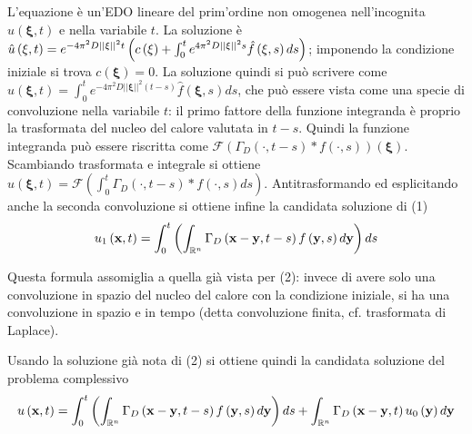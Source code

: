 \documentclass{article}
\begin{document}
L'equazione \`{e} un'EDO lineare del prim'ordine non omogenea nell'incognita 
$\hat{u}\left( \mathbf{\xi },t\right) $ e nella variabile $t$. La soluzione 
\`{e} $\hat{u}\left( \mathbf{\xi },t\right) =e^{-4\pi ^{2}D\left\vert
\left\vert \mathbf{\xi }\right\vert \right\vert ^{2}t}\left( c\left( \mathbf{%
\xi }\right) +\int_{0}^{t}e^{4\pi ^{2}D\left\vert \left\vert \mathbf{\xi }%
\right\vert \right\vert ^{2}s}\hat{f}\left( \xi ,s\right) ds\right) $;
imponendo la condizione iniziale si trova $c\left( \mathbf{\xi }\right) =0$.
La soluzione quindi si pu\`{o} scrivere come $\hat{u}\left( \mathbf{\xi }%
,t\right) =\int_{0}^{t}e^{-4\pi ^{2}D\left\vert \left\vert \mathbf{\xi }%
\right\vert \right\vert ^{2}\left( t-s\right) }\hat{f}\left( \mathbf{\xi }%
,s\right) ds$, che pu\`{o} essere vista come una specie di convoluzione
nella variabile $t$: il primo fattore della funzione integranda \`{e}
proprio la trasformata del nucleo del calore valutata in $t-s$. Quindi la
funzione integranda pu\`{o} essere riscritta come $\mathcal{F}\left( \Gamma
_{D}\left( \cdot ,t-s\right) \ast f\left( \cdot ,s\right) \right) \left( 
\mathbf{\xi }\right) $. Scambiando trasformata e integrale si ottiene $\hat{u%
}\left( \mathbf{\xi },t\right) =\mathcal{F}\left( \int_{0}^{t}\Gamma
_{D}\left( \cdot ,t-s\right) \ast f\left( \cdot ,s\right) ds\right) $.
Antitrasformando ed esplicitando anche la seconda convoluzione si ottiene
infine la candidata soluzione di (1)%
\begin{equation*}
u_{1}\left( \mathbf{x},t\right) =\int_{0}^{t}\left( \int_{%
\mathbb{R}
^{n}}\Gamma _{D}\left( \mathbf{x-y},t-s\right) f\left( \mathbf{y},s\right) d%
\mathbf{y}\right) ds
\end{equation*}

Questa formula assomiglia a quella gi\`{a} vista per (2): invece di avere
solo una convoluzione in spazio del nucleo del calore con la condizione
iniziale, si ha una convoluzione in spazio e in tempo (detta convoluzione
finita, cf. trasformata di Laplace).

Usando la soluzione gi\`{a} nota di (2) si ottiene quindi la candidata
soluzione del problema complessivo%
\begin{equation*}
u\left( \mathbf{x},t\right) =\int_{0}^{t}\left( \int_{%
\mathbb{R}
^{n}}\Gamma _{D}\left( \mathbf{x-y},t-s\right) f\left( \mathbf{y},s\right) d%
\mathbf{y}\right) ds+\int_{%
\mathbb{R}
^{n}}\Gamma _{D}\left( \mathbf{x-y},t\right) u_{0}\left( \mathbf{y}\right) d%
\mathbf{y}
\end{equation*}
\end{document}
